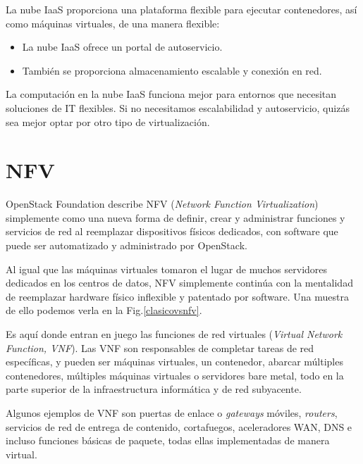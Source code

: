 La nube IaaS proporciona una plataforma flexible para ejecutar contenedores, así como máquinas virtuales, de una manera flexible:

\begin{itemize}
\item La nube IaaS ofrece un portal de autoservicio.
\item También se proporciona almacenamiento escalable y conexión en red.
\end{itemize}

La computación en la nube IaaS funciona mejor para entornos que necesitan soluciones de IT flexibles. Si no necesitamos escalabilidad y autoservicio, quizás sea mejor optar por otro tipo de virtualización.

\section{NFV}

OpenStack Foundation describe NFV (\textit{Network Function Virtualization}) simplemente como una nueva forma de definir, crear y administrar funciones y servicios de red al reemplazar dispositivos físicos dedicados, con software que puede ser automatizado y administrado por OpenStack.

Al igual que las máquinas virtuales tomaron el lugar de muchos servidores dedicados en los centros de datos, NFV simplemente continúa con la mentalidad de reemplazar hardware físico inflexible y patentado por software. Una muestra de ello podemos verla en la Fig.\ref{clasicovsnfv}. 

Es aquí donde entran en juego las funciones de red virtuales (\textit{Virtual Network Function, VNF}). Las VNF son responsables de completar tareas de red específicas, y pueden ser máquinas virtuales, un contenedor, abarcar múltiples contenedores, múltiples máquinas virtuales o servidores bare metal, todo en la parte superior de la infraestructura informática y de red subyacente. 

Algunos ejemplos de VNF son puertas de enlace o \textit{gateways} móviles, \textit{routers}, servicios de red de entrega de contenido, cortafuegos, aceleradores WAN, DNS e incluso funciones básicas de paquete, todas ellas implementadas de manera virtual.


